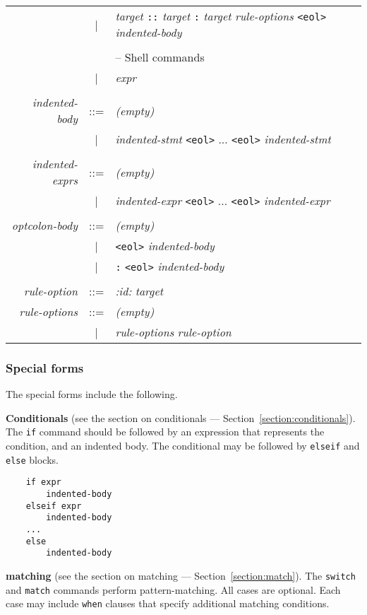 \begin{tabular}{rcl}
& | & \emph{target} \texttt{::} \emph{target} \texttt{:} \emph{target} \emph{rule-options} \verb+<eol>+ \emph{indented-body}\\
\\
&   & -- Shell commands\\
& | & \emph{expr}\\
\\
\emph{indented-body} & ::= & \emph{(empty)}\\
& | & \emph{indented-stmt} \verb+<eol>+ ... \verb+<eol>+ \emph{indented-stmt}\\
\\
\emph{indented-exprs} & ::= & \emph{(empty)}\\
& | & \emph{indented-expr} \verb+<eol>+ ... \verb+<eol>+ \emph{indented-expr}\\
\\
\emph{optcolon-body} & ::= & \emph{(empty)}\\
& | & \verb+<eol>+ \emph{indented-body}\\
& | & \texttt{:} \verb+<eol>+ \emph{indented-body}\\
\\
\emph{rule-option} & ::= & \emph{:id:} \emph{target}\\
\emph{rule-options} & ::= & \emph{(empty)}\\
& | & \emph{rule-options} \emph{rule-option}
\end{tabular}

\subsubsection{Special forms}

The special forms include the following.

\textbf{Conditionals} (see the section on conditionals --- Section~\ref{section:conditionals}).  The \verb+if+ command
should be followed by an expression that represents the condition, and an indented body.  The
conditional may be followed by \verb+elseif+ and \verb+else+ blocks.

\begin{verbatim}
    if expr
        indented-body
    elseif expr
        indented-body
    ...
    else
        indented-body
\end{verbatim}

\textbf{matching} (see the section on matching --- Section~\ref{section:match}).  The \verb+switch+ and
\verb+match+ commands perform pattern-matching.  All cases are optional.  Each case may include
\verb+when+ clauses that specify additional matching conditions.

